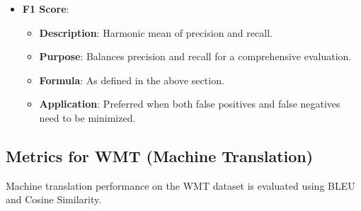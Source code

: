\begin{itemize}
\begin{itemize}
\[        \]
        \item \textbf{Application}: Important when missing positive instances is undesirable.
    \end{itemize}
    \item \textbf{F1 Score}:
    \begin{itemize}
        \item \textbf{Description}: Harmonic mean of precision and recall.
        \item \textbf{Purpose}: Balances precision and recall for a comprehensive evaluation.
        \item \textbf{Formula}: As defined in the above section.
        \item \textbf{Application}: Preferred when both false positives and false negatives need to be minimized.
    \end{itemize}
\end{itemize}

\subsection{Metrics for WMT (Machine Translation)}
Machine translation performance on the WMT dataset is evaluated using BLEU and Cosine Similarity.

